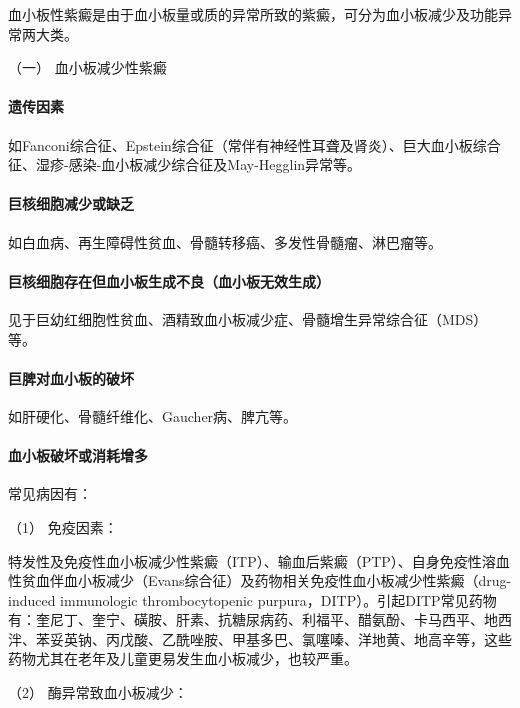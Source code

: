 血小板性紫癜是由于血小板量或质的异常所致的紫癜，可分为血小板减少及功能异常两大类。

\hypertarget{text00036.htmlux5cux23CHP1-14-1-2-1}{}
（一） 血小板减少性紫癜

\paragraph{遗传因素}

如Fanconi综合征、Epstein综合征（常伴有神经性耳聋及肾炎）、巨大血小板综合征、湿疹-感染-血小板减少综合征及May-Hegglin异常等。

\paragraph{巨核细胞减少或缺乏}

如白血病、再生障碍性贫血、骨髓转移癌、多发性骨髓瘤、淋巴瘤等。

\paragraph{巨核细胞存在但血小板生成不良（血小板无效生成）}

见于巨幼红细胞性贫血、酒精致血小板减少症、骨髓增生异常综合征（MDS）等。

\paragraph{巨脾对血小板的破坏}

如肝硬化、骨髓纤维化、Gaucher病、脾亢等。

\paragraph{血小板破坏或消耗增多}

常见病因有：

\hypertarget{text00036.htmlux5cux23CHP1-14-1-2-1-5-1}{}
（1） 免疫因素：

特发性及免疫性血小板减少性紫癜（ITP）、输血后紫癜（PTP）、自身免疫性溶血性贫血伴血小板减少（Evans综合征）及药物相关免疫性血小板减少性紫癜（drug-induced
immunologic thrombocytopenic
purpura，DITP）。引起DITP常见药物有：奎尼丁、奎宁、磺胺、肝素、抗糖尿病药、利福平、醋氨酚、卡马西平、地西泮、苯妥英钠、丙戊酸、乙酰唑胺、甲基多巴、氯噻嗪、洋地黄、地高辛等，这些药物尤其在老年及儿童更易发生血小板减少，也较严重。

\hypertarget{text00036.htmlux5cux23CHP1-14-1-2-1-5-2}{}
（2） 酶异常致血小板减少：

